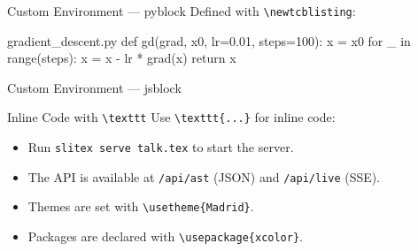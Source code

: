 \documentclass[aspectratio=169]{beamer}
\begin{document}

\begin{frame}[fragile]{Custom Environment — pyblock}
  Defined with \texttt{\textbackslash newtcblisting}:

  \begin{pyblock}{gradient\_descent.py}
def gd(grad, x0, lr=0.01, steps=100):
    x = x0
    for _ in range(steps):
        x = x - lr * grad(x)
    return x
  \end{pyblock}
\end{frame}

\begin{frame}[fragile]{Custom Environment — jsblock}
\end{frame}


\begin{frame}{Inline Code with \texttt{\textbackslash texttt}}
  Use \texttt{\textbackslash texttt\{...\}} for inline code:

  \begin{itemize}
    \item Run \texttt{slitex serve talk.tex} to start the server.
    \item The API is available at \texttt{/api/ast} (JSON) and \texttt{/api/live} (SSE).
    \item Themes are set with \texttt{\textbackslash usetheme\{Madrid\}}.
    \item Packages are declared with \texttt{\textbackslash usepackage\{xcolor\}}.
  \end{itemize}
\end{frame}
\end{document}
